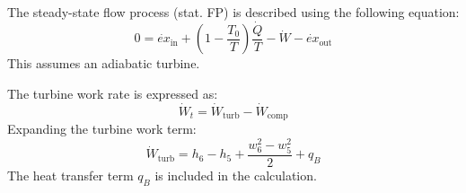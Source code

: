 The steady-state flow process (stat. FP) is described using the following equation:  
\[
0 = \dot{ex}_{\text{in}} + \left( 1 - \frac{T_0}{T} \right) \frac{\dot{Q}}{T} - \dot{W} - \dot{ex}_{\text{out}}
\]  
This assumes an adiabatic turbine.  

The turbine work rate is expressed as:  
\[
\dot{W}_t = \dot{W}_{\text{turb}} - \dot{W}_{\text{comp}}
\]  
Expanding the turbine work term:  
\[
\dot{W}_{\text{turb}} = h_6 - h_5 + \frac{w_6^2 - w_5^2}{2} + q_B
\]  
The heat transfer term \( q_B \) is included in the calculation.